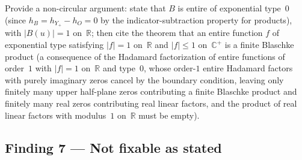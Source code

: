 \documentclass[11pt]{article}
\newcommand{\R}{\mathbb{R}}
\newcommand{\C}{\mathbb{C}}
\begin{document}
\begin{description}[leftmargin=0pt]
\item[What would establish it:]
Provide a non-circular argument: state that $B$ is entire of exponential type~$0$
(since $h_B=h_{Y_+}-h_O=0$ by the indicator-subtraction property for products),
with $|B(u)|=1$ on~$\R$; then cite the theorem that an entire function $f$ of
exponential type satisfying $|f|=1$ on~$\R$ and $|f|\le 1$ on~$\C^+$ is a finite
Blaschke product (a consequence of the Hadamard factorization of entire functions
of order~$1$ with $|f|=1$ on~$\R$ and type~$0$, whose order-$1$ entire Hadamard
factors with purely imaginary zeros cancel by the boundary condition, leaving only
finitely many upper half-plane zeros contributing a finite Blaschke product and
finitely many real zeros contributing real linear factors, and the product of real
linear factors with modulus~$1$ on~$\R$ must be empty).
\end{description}

\subsection*{Finding 7 — Not fixable as stated}
\end{document}
